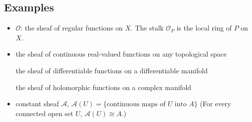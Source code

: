 \subsection*{Examples} 
\begin{itemize}
	\item $\mathcal{O}$: the sheaf of regular functions on $X$. The stalk $\mathcal{O}_P$ is the {\color{red}local ring} of $P$ on $X$.
	\item the sheaf of continuous real-valued functions on any topological space

the sheaf of differentiable functions on a differentiable manifold

the sheaf of holomorphic functions on a complex manifold
	\item constant sheaf $\mathcal{A}$, $\mathcal{A}(U)=\{\mbox{continuous maps of $U$ into $A$}\}$ ({\color{red}For every connected open set $U$, $\mathcal{A}(U)\cong A$}.)
\end{itemize}






